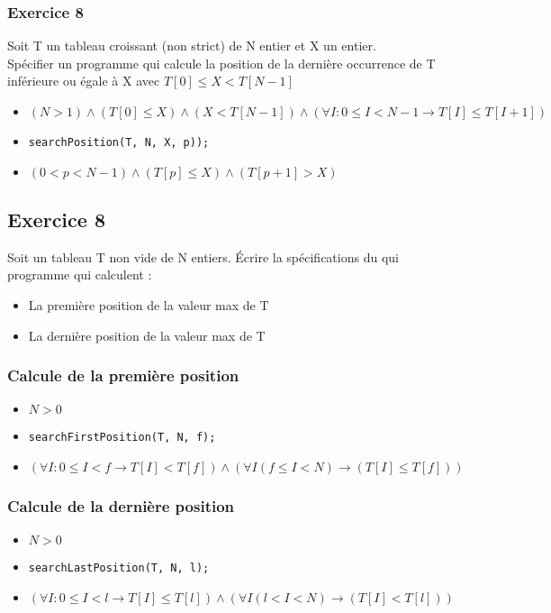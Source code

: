 \subsubsection{Exercice 8}
	Soit T un tableau croissant (non strict) de N entier et X un entier.\\
	Spécifier un programme qui calcule la position de la dernière occurrence de T inférieure ou égale à X avec $T[0] \leq X < T[N-1]$

	\begin{itemize}
		\item $(N > 1) \wedge (T[0] \leq X) \wedge (X < T[N-1]) \wedge (\forall I : 0 \leq I < N - 1 \rightarrow T[I] \leq T[I+1])$
		\item \texttt{searchPosition(T, N, X, p));} 
		\item $(0 < p < N - 1) \wedge (T[p] \leq X) \wedge (T[p+1] > X)$
	\end{itemize}

\subsection{Exercice 8}
	Soit un tableau T non vide de N entiers.  \'Ecrire la spécifications du qui programme qui calculent :
	\begin{itemize}
		\item La première position de la valeur max de T
		\item La dernière position de la valeur max de T
	\end{itemize}
	\subsubsection{Calcule de la première position}
	\begin{itemize}
		\item $N > 0$ 
		\item \texttt{searchFirstPosition(T, N, f);} 
		\item $(\forall I :0 \leq I < f \rightarrow T[I] < T[f]) \wedge (\forall I (f \leq I < N) \rightarrow (T[I] \leq T[f]))$ 
	\end{itemize}
	\subsubsection{Calcule de la dernière position}
	\begin{itemize}
		\item $N > 0$ 
		\item \texttt{searchLastPosition(T, N, l);} 
		\item $(\forall I :0 \leq I < l \rightarrow T[I] \leq T[l]) \wedge 
			(\forall I (l < I < N) \rightarrow (T[I] < T[l]))$ 
	\end{itemize}

